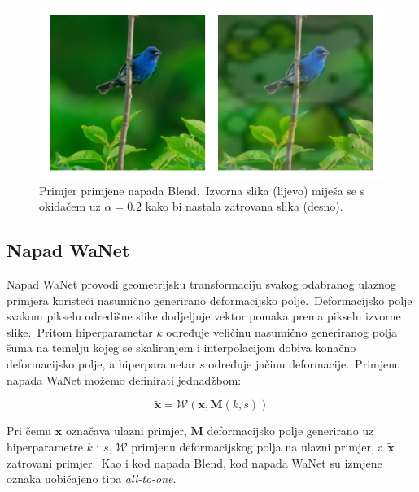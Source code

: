 \documentclass[diplomskirad]{fer}
\begin{document}
\begin{figure}[h]
  \centering
  \includegraphics[scale=0.6]{./Slike/imagenet1k_uzorak_blend.png}
  \caption{Primjer primjene napada Blend.\ Izvorna slika (lijevo) miješa se s okidačem uz $\alpha = 0.2$ kako bi nastala zatrovana slika (desno).}
  \label{fig:blend}
\end{figure}
  
\subsection{Napad WaNet}
\label{sub:wanet}

Napad WaNet provodi geometrijsku transformaciju svakog odabranog ulaznog primjera koristeći nasumično generirano deformacijsko polje.\ Deformacijsko polje svakom pikselu odredišne slike dodjeljuje vektor pomaka prema pikselu izvorne slike.\
Pritom hiperparametar $k$ određuje veličinu nasumično generiranog polja šuma na temelju kojeg se skaliranjem i interpolacijom dobiva konačno deformacijsko polje, a hiperparametar $s$ određuje jačinu deformacije.\ 
Primjenu napada WaNet možemo definirati jednadžbom:

\begin{equation}
  \bm{\tilde{x}} = \mathcal{W}(\bm{x}, \bm{M}(k, s))
  \label{eq:wanet}
\end{equation}

\pagebreak

Pri čemu $\bm{x}$ označava ulazni primjer, $\bm{M}$ deformacijsko polje generirano uz hiperparametre $k$ i $s$, $\mathcal{W}$ primjenu deformacijskog polja na ulazni primjer, a $\bm{\tilde{x}}$ zatrovani primjer.\ 
Kao i kod napada Blend, kod napada WaNet su izmjene oznaka uobičajeno tipa \textit{all-to-one}.\ 
\end{document}
